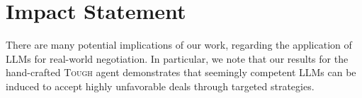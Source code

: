 \documentclass{article}
\theoremstyle{plain}
\theoremstyle{definition}
\theoremstyle{remark}
\begin{document}



\clearpage
\section*{Impact Statement}

There are many potential implications
of our work, regarding the application of LLMs for real-world negotiation.  
In particular, we note that our results for the hand-crafted \textsc{Tough} agent demonstrates that seemingly competent LLMs can be induced to accept highly unfavorable deals through targeted strategies.  











\end{document}
